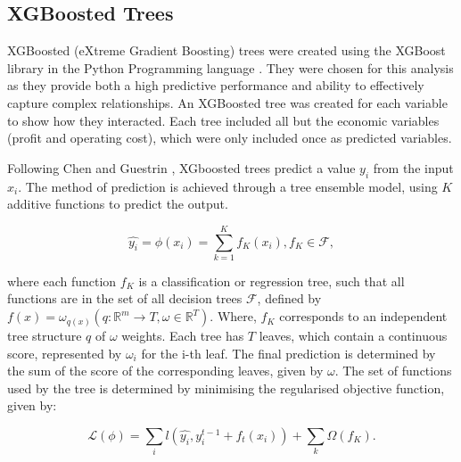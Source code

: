 \documentclass[review,12pt,authoryear]{elsarticle}
\begin{document}
\begin{linenumbers}
\subsection{XGBoosted Trees}
XGBoosted (eXtreme Gradient Boosting) trees were created using the XGBoost library \citep{chenXGBoostScalableTree2016} in the Python Programming language \citep{g.vanrossumPythonTutorialTechnical1995}. They were chosen for this analysis as they provide both a high predictive performance and ability to effectively capture complex relationships. An XGBoosted tree was created for each variable to show how they interacted. Each tree included all but the economic variables (profit and operating cost), which were only included once as predicted variables.
\par
Following Chen and Guestrin \citep{chenXGBoostScalableTree2016}, XGboosted trees predict a value $y_i$ from the input $x_i$. The method of prediction is achieved through a tree ensemble model, using $K$ additive functions to predict the output. 

\begin{equation}
  \hat{y_i}=\phi(x_i)=\sum_{k=1}^{K}{f_{K}(x_{i})}, f_{K}\in \mathcal{F},
\end{equation}

where each function $f_K$ is a classification or regression tree, such that all functions are in the set of all decision trees $\mathcal{F}$, defined by ${f(x) = \omega_{q(x)}}(q : \mathbb{R}^m \rightarrow T, \omega \in \mathbb{R}^T)$. Where, $f_K$ corresponds to an independent tree structure $q$ of $\omega$ weights. Each tree has $T$ leaves, which contain a continuous score, represented by $\omega_i$ for the i-th leaf. The final prediction is determined by the sum of the score of the corresponding leaves, given  by $\omega$. The set of functions used by the tree is determined by minimising the regularised objective function, given by:

\begin{equation}\label{eqn:objective}
 \mathcal{L}(\phi)=\sum_i l(\hat{y_i}, y_i^{t-1} + f_t(x_i)) + \sum_k \Omega (f_K).
\end{equation}


\end{linenumbers}
\end{document}
